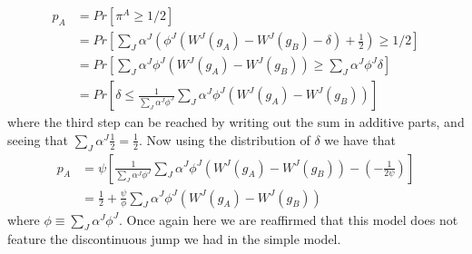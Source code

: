 \begin{equation}
    \begin{split}
        p_A &= Pr[\pi^A \geq 1/2] \\ 
        &=Pr\left[
            \sum_J \alpha^J \left(\phi^J (W^J(g_A) - W^J(g_B)  - \delta) + \frac{1}{2}\right) \geq 1/2
            \right] \\ 
        &= Pr\left[
            \sum_J \alpha^J \phi^J \left(W^J(g_A) - W^J(g_B)\right) \geq \sum_J\alpha^J \phi^J \delta
            \right] \\ 
            &= Pr\left[
                \delta \leq 
                \frac{1}{\sum_J \alpha^J \phi^J} 
                \sum_J \alpha^J 
                    \phi^J \left(W^J(g_A) - W^J(g_B)
                \right)       
                \right]            
    \end{split}
\end{equation}
where the third step can be reached by writing out the sum in additive parts, and seeing that $\sum_J \alpha^J \frac{1}{2} = \frac{1}{2}$. Now using the distribution of $\delta$ we have that 
\begin{equation}
    \begin{split}
    p_A &= \psi \left[
        \frac{1}{\sum_J \alpha^J \phi^J} 
        \sum_J \alpha^J 
            \phi^J \left(W^J(g_A) - W^J(g_B)
        \right) - \left(- \frac{1}{2\psi}\right)
    \right] \\ 
    &= 
    \frac{1}{2} + 
    \frac{\psi}{\phi} 
    \sum_J \alpha^J 
        \phi^J \left(W^J(g_A) - W^J(g_B)
    \right) 
    \end{split}
\end{equation}
where $\phi \equiv \sum_J \alpha^J \phi^J$. Once again here we are reaffirmed that this model does not feature the discontinuous jump we had in the simple model. 

